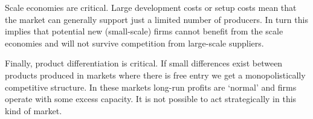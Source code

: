 Scale economies are critical. Large development costs or setup costs mean
that the market can generally support just a limited number of producers.
In turn this implies that potential new (small-scale) firms cannot benefit
from the scale economies and will not survive competition from large-scale
suppliers.

Finally, product differentiation is critical. If small differences exist
between products produced in markets where there is free entry we get a
monopolistically competitive structure. In these markets long-run profits
are `normal' and firms operate with some excess capacity. It is not possible
to act strategically in this kind of market.